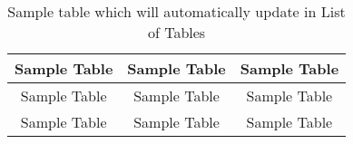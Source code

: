 \begin{table}
    \centering
    \caption{Sample table which will automatically update in List of Tables}
    \label{tab:sample-table}
    \begin{tabular}{ccc} \toprule
        Sample Table & Sample Table & Sample Table \\ \midrule
        Sample Table & Sample Table & Sample Table \\
        Sample Table & Sample Table & Sample Table \\ \bottomrule
    \end{tabular}
\end{table}